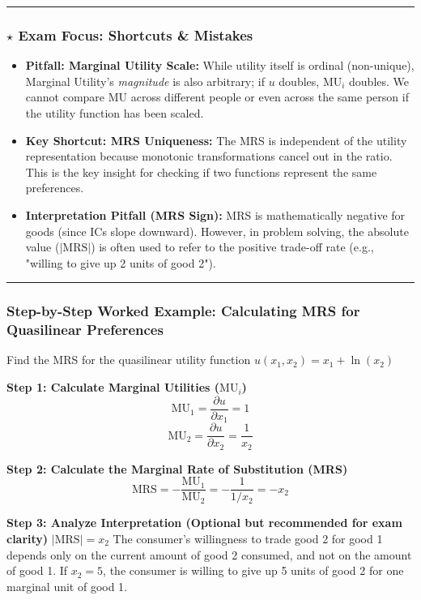 \documentclass{article}
\begin{document}
\noindent\rule{\linewidth}{0.4pt}

\subsubsection*{$\star$ Exam Focus: Shortcuts \& Mistakes}
\begin{itemize}
    \item \textbf{Pitfall: Marginal Utility Scale:} While utility itself is ordinal (non-unique), Marginal Utility's \textit{magnitude} is also arbitrary; if $u$ doubles, $\text{MU}_i$ doubles. We cannot compare MU across different people or even across the same person if the utility function has been scaled.

    \item \textbf{Key Shortcut: MRS Uniqueness:} The MRS is independent of the utility representation because monotonic transformations cancel out in the ratio. This is the key insight for checking if two functions represent the same preferences.

    \item \textbf{Interpretation Pitfall (MRS Sign):} MRS is mathematically negative for goods (since ICs slope downward). However, in problem solving, the absolute value ($|\text{MRS}|$) is often used to refer to the positive trade-off rate (e.g., "willing to give up 2 units of good 2").
\end{itemize}

\noindent\rule{\linewidth}{0.4pt}

\subsubsection*{Step-by-Step Worked Example: Calculating MRS for Quasilinear Preferences}

Find the MRS for the quasilinear utility function $u(x_1, x_2) = x_1 + \ln(x_2)$

\textbf{Step 1: Calculate Marginal Utilities ($\text{MU}_i$)}
\[ \text{MU}_1 = \frac{\partial u}{\partial x_1} = 1 \]
\[ \text{MU}_2 = \frac{\partial u}{\partial x_2} = \frac{1}{x_2} \]

\textbf{Step 2: Calculate the Marginal Rate of Substitution (MRS)}
\[\text{MRS} = -\frac{\text{MU}_1}{\text{MU}_2} = -\frac{1}{1/x_2} = -x_2\]

\textbf{Step 3: Analyze Interpretation (Optional but recommended for exam clarity)}
$|\text{MRS}| = x_2$ The consumer's willingness to trade good 2 for good 1 depends only on the current amount of good 2 consumed, and not on the amount of good 1. If $x_2=5$, the consumer is willing to give up 5 units of good 2 for one marginal unit of good 1.
\end{document}
